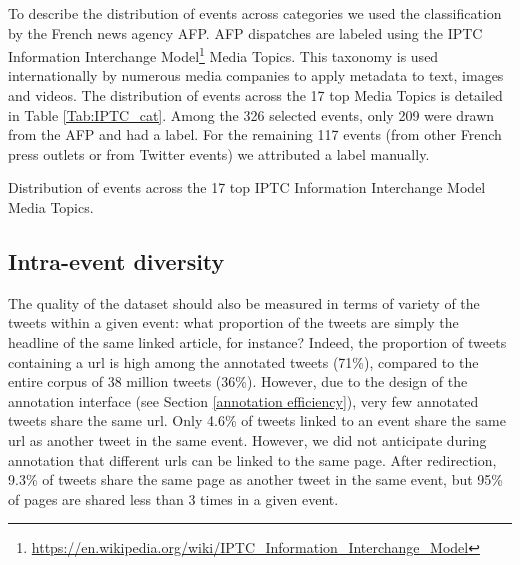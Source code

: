%
%

To describe the distribution of events across categories we used the classification by the French news agency AFP. AFP dispatches are labeled using the IPTC Information Interchange Model\footnote{\url{https://en.wikipedia.org/wiki/IPTC_Information_Interchange_Model}} Media Topics. This taxonomy is used internationally by numerous media companies to apply metadata to text, images and videos. The distribution of events across the 17 top Media Topics is detailed in Table \ref{Tab:IPTC_cat}. Among the 326 selected events, only 209 were drawn from the AFP and had a label. For the remaining 117 events (from other French press outlets or from Twitter events) we attributed a label manually.

\begin{table}
\begin{center}
\makebox[\textwidth][c]{}
\end{center}
\caption{Distribution of events across the 17 top IPTC Information Interchange Model Media Topics. \label{Tab:IPTC_cat}}
\end{table}

\subsection{Intra-event diversity}
The quality of the dataset should also be measured in
terms of variety of the tweets within a given event: what
proportion of the tweets are simply the headline of the
same linked article, for instance? Indeed, the proportion of
tweets containing a url is high among the annotated
tweets (71\%), compared to the entire corpus of 38 million
tweets (36\%). However, due to the design of the
annotation interface (see Section \ref{annotation efficiency}), very few
annotated tweets share the same url. Only 4.6\% of tweets
linked to an event share the same url as another tweet in
the same event.
However, we did not anticipate during annotation that
different urls can be linked to the same page. After redirection,
9.3\% of tweets share the same page as another tweet in
the same event, but 95\% of pages are shared less than 3
times in a given event.

